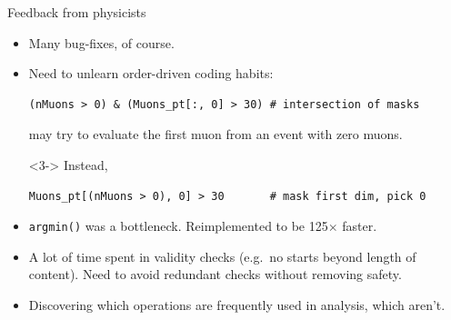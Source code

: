 \documentclass[aspectratio=169]{beamer}
\begin{document}
\begin{frame}[fragile]{Feedback from physicists}
\vspace{0.5 cm}\large
\begin{itemize}\setlength{\itemsep}{0.3 cm}
\item<1-> Many bug-fixes, of course.
\item<2-> Need to unlearn order-driven coding habits:

\small\begin{verbatim}
(nMuons > 0) & (Muons_pt[:, 0] > 30) # intersection of masks
\end{verbatim}
\large

may try to evaluate the first muon from an event with zero muons.

\vspace{0.25 cm}
\begin{uncoverenv}<3->
Instead,

\small\begin{verbatim}
Muons_pt[(nMuons > 0), 0] > 30       # mask first dim, pick 0
\end{verbatim}
\end{uncoverenv}
\large

\item<4-> {\tt\small argmin()} was a bottleneck. Reimplemented to be 125$\times$ faster.

\item<5-> A lot of time spent in validity checks (e.g.\ no starts beyond length of content). Need to avoid redundant checks without removing safety.

\item<6-> Discovering which operations are frequently used in analysis, which aren't.
\end{itemize}
\end{frame}
\end{document}
